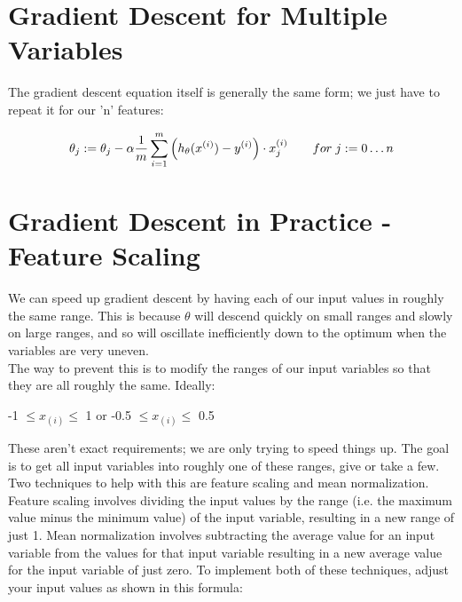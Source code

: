 \section{Gradient Descent for Multiple Variables}

The gradient descent equation itself is generally the same form; we just have to repeat it for our 'n' features:

\begin{equation}
\theta_j := \theta_j-\alpha \frac{1}{m} \sum_{i=1}^{m}\left(h_\theta(x^{(i)})-y^{(i)}\right)\cdot x^{(i)}_j \hspace{0.7cm} for \hspace{0.1cm} j := 0 \dots n
\end{equation}

\section{Gradient Descent in Practice - Feature Scaling}

We can speed up gradient descent by having each of our input values in roughly the same range. This is because $\theta$ will descend quickly on small ranges and slowly on large ranges, and so will oscillate inefficiently down to the optimum when the variables are very uneven.\\

The way to prevent this is to modify the ranges of our input variables so that they are all roughly the same. Ideally:\\

\begin{center}
-1 $\leq  x_{(i)} \leq $ 1 or -0.5 $ \leq  x_{(i)} \leq $ 0.5
\end{center}

These aren't exact requirements; we are only trying to speed things up. The goal is to get all input variables into roughly one of these ranges, give or take a few.\\

Two techniques to help with this are feature scaling and mean normalization. Feature scaling involves dividing the input values by the range (i.e. the maximum value minus the minimum value) of the input variable, resulting in a new range of just 1. Mean normalization involves subtracting the average value for an input variable from the values for that input variable resulting in a new average value for the input variable of just zero. To implement both of these techniques, adjust your input values as shown in this formula:

